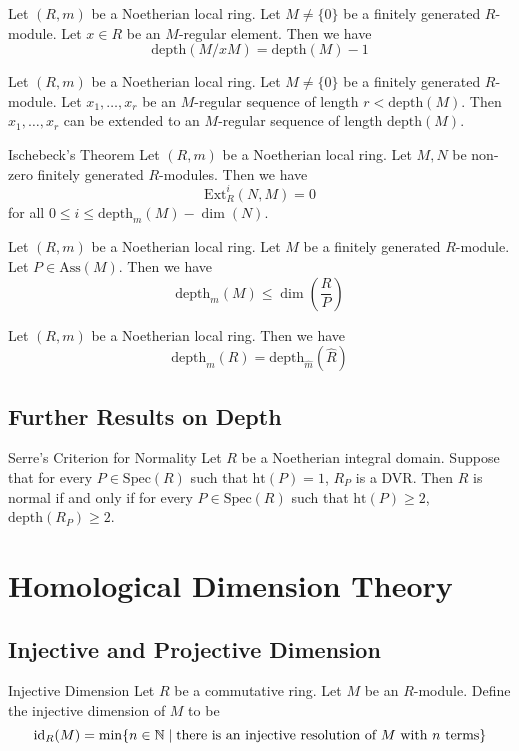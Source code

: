 \documentclass[a4paper]{article}
\begin{document}
\begin{lmm}{}{} Let $(R,m)$ be a Noetherian local ring. Let $M\neq\{0\}$ be a finitely generated $R$-module. Let $x\in R$ be an $M$-regular element. Then we have $$\text{depth}(M/xM)=\text{depth}(M)-1$$
\end{lmm}

\begin{crl}{}{} Let $(R,m)$ be a Noetherian local ring. Let $M\neq\{0\}$ be a finitely generated $R$-module. Let $x_1,\dots,x_r$ be an $M$-regular sequence of length $r<\text{depth}(M)$. Then $x_1,\dots,x_r$ can be extended to an $M$-regular sequence of length $\text{depth}(M)$. 
\end{crl}

\begin{thm}{Ischebeck's Theorem}{} Let $(R,m)$ be a Noetherian local ring. Let $M,N$ be non-zero finitely generated $R$-modules. Then we have $$\text{Ext}_R^i(N,M)=0$$ for all $0\leq i\leq\text{depth}_m(M)-\dim(N)$. 
\end{thm}

\begin{prp}{}{} Let $(R,m)$ be a Noetherian local ring. Let $M$ be a finitely generated $R$-module. Let $P\in\text{Ass}(M)$. Then we have $$\text{depth}_m(M)\leq\dim\left(\frac{R}{P}\right)$$
\end{prp}

\begin{prp}{}{} Let $(R,m)$ be a Noetherian local ring. Then we have $$\text{depth}_m(R)=\text{depth}_{\widehat{m}}(\widehat{R})$$
\end{prp}

\subsection{Further Results on Depth}
\begin{thm}{Serre's Criterion for Normality}{} Let $R$ be a Noetherian integral domain. Suppose that for every $P\in\text{Spec}(R)$ such that $\text{ht}(P)=1$, $R_P$ is a DVR. Then $R$ is normal if and only if for every $P\in\text{Spec}(R)$ such that $\text{ht}(P)\geq 2$, $\text{depth}(R_P)\geq 2$. 
\end{thm}

\pagebreak
\section{Homological Dimension Theory}
\subsection{Injective and Projective Dimension}
\begin{defn}{Injective Dimension}{} Let $R$ be a commutative ring. Let $M$ be an $R$-module. Define the injective dimension of $M$ to be $$\text{id}_R(M)=\min\{n\in\mathbb{N}\;|\;\text{there is an injective resolution of }M\text{ with }n\text{ terms}\}$$
\end{defn}
\end{document}
